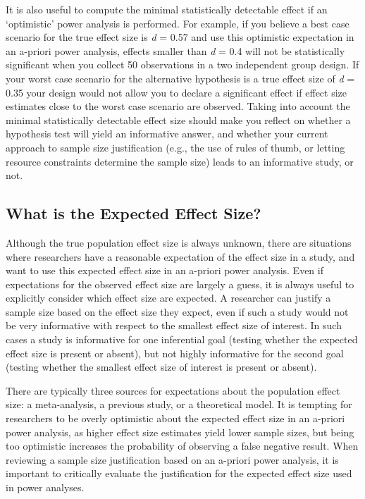 \documentclass[
  english,
  ,jou, a4paper,floatsintext]{apa6}
\begin{document}
It is also useful to compute the minimal statistically detectable effect if an `optimistic' power analysis is performed. For example, if you believe a best case scenario for the true effect size is \emph{d} = 0.57 and use this optimistic expectation in an a-priori power analysis, effects smaller than \emph{d} = 0.4 will not be statistically significant when you collect 50 observations in a two independent group design. If your worst case scenario for the alternative hypothesis is a true effect size of \emph{d} = 0.35 your design would not allow you to declare a significant effect if effect size estimates close to the worst case scenario are observed. Taking into account the minimal statistically detectable effect size should make you reflect on whether a hypothesis test will yield an informative answer, and whether your current approach to sample size justification (e.g., the use of rules of thumb, or letting resource constraints determine the sample size) leads to an informative study, or not.

\hypertarget{what-is-the-expected-effect-size}{%
\subsection{What is the Expected Effect Size?}\label{what-is-the-expected-effect-size}}

Although the true population effect size is always unknown, there are situations where researchers have a reasonable expectation of the effect size in a study, and want to use this expected effect size in an a-priori power analysis. Even if expectations for the observed effect size are largely a guess, it is always useful to explicitly consider which effect size are expected. A researcher can justify a sample size based on the effect size they expect, even if such a study would not be very informative with respect to the smallest effect size of interest. In such cases a study is informative for one inferential goal (testing whether the expected effect size is present or absent), but not highly informative for the second goal (testing whether the smallest effect size of interest is present or absent).

There are typically three sources for expectations about the population effect size: a meta-analysis, a previous study, or a theoretical model. It is tempting for researchers to be overly optimistic about the expected effect size in an a-priori power analysis, as higher effect size estimates yield lower sample sizes, but being too optimistic increases the probability of observing a false negative result. When reviewing a sample size justification based on an a-priori power analysis, it is important to critically evaluate the justification for the expected effect size used in power analyses.
\end{document}
